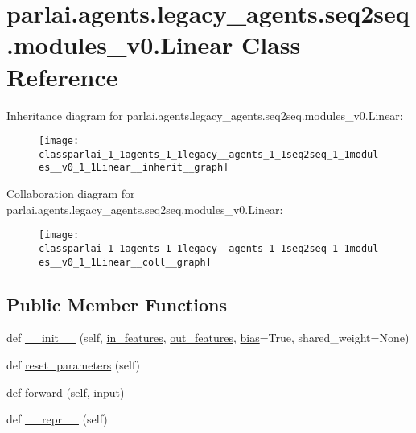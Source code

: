 \hypertarget{classparlai_1_1agents_1_1legacy__agents_1_1seq2seq_1_1modules__v0_1_1Linear}{}\section{parlai.\+agents.\+legacy\+\_\+agents.\+seq2seq.\+modules\+\_\+v0.\+Linear Class Reference}
\label{classparlai_1_1agents_1_1legacy__agents_1_1seq2seq_1_1modules__v0_1_1Linear}


Inheritance diagram for parlai.\+agents.\+legacy\+\_\+agents.\+seq2seq.\+modules\+\_\+v0.\+Linear\+:
\nopagebreak
\begin{figure}[H]
\begin{center}
\leavevmode
\texttt{[image: classparlai\_1\_1agents\_1\_1legacy\_\_agents\_1\_1seq2seq\_1\_1modules\_\_v0\_1\_1Linear\_\_inherit\_\_graph]}
\end{center}
\end{figure}


Collaboration diagram for parlai.\+agents.\+legacy\+\_\+agents.\+seq2seq.\+modules\+\_\+v0.\+Linear\+:
\nopagebreak
\begin{figure}[H]
\begin{center}
\leavevmode
\texttt{[image: classparlai\_1\_1agents\_1\_1legacy\_\_agents\_1\_1seq2seq\_1\_1modules\_\_v0\_1\_1Linear\_\_coll\_\_graph]}
\end{center}
\end{figure}
\subsection*{Public Member Functions}
\begin{DoxyCompactItemize}
\item 
def \hyperlink{classparlai_1_1agents_1_1legacy__agents_1_1seq2seq_1_1modules__v0_1_1Linear_a961944a7bcebe7bee8c32967e505994d}{\+\_\+\+\_\+init\+\_\+\+\_\+} (self, \hyperlink{classparlai_1_1agents_1_1legacy__agents_1_1seq2seq_1_1modules__v0_1_1Linear_a79479f805ef73bba4f52a676999e06da}{in\+\_\+features}, \hyperlink{classparlai_1_1agents_1_1legacy__agents_1_1seq2seq_1_1modules__v0_1_1Linear_add537bbe47b10f383ff20b4244c2a38a}{out\+\_\+features}, \hyperlink{classparlai_1_1agents_1_1legacy__agents_1_1seq2seq_1_1modules__v0_1_1Linear_add46cc133ca8a969cee42cef77c87466}{bias}=True, shared\+\_\+weight=None)
\item 
def \hyperlink{classparlai_1_1agents_1_1legacy__agents_1_1seq2seq_1_1modules__v0_1_1Linear_a1ec65604d05f105801a61de18d16caa1}{reset\+\_\+parameters} (self)
\item 
def \hyperlink{classparlai_1_1agents_1_1legacy__agents_1_1seq2seq_1_1modules__v0_1_1Linear_a5114a45ac1b8e2a07c399da5bff760be}{forward} (self, input)
\item 
def \hyperlink{classparlai_1_1agents_1_1legacy__agents_1_1seq2seq_1_1modules__v0_1_1Linear_aad59400f7c8edf9b07305749b928186b}{\+\_\+\+\_\+repr\+\_\+\+\_\+} (self)
\end{DoxyCompactItemize}
